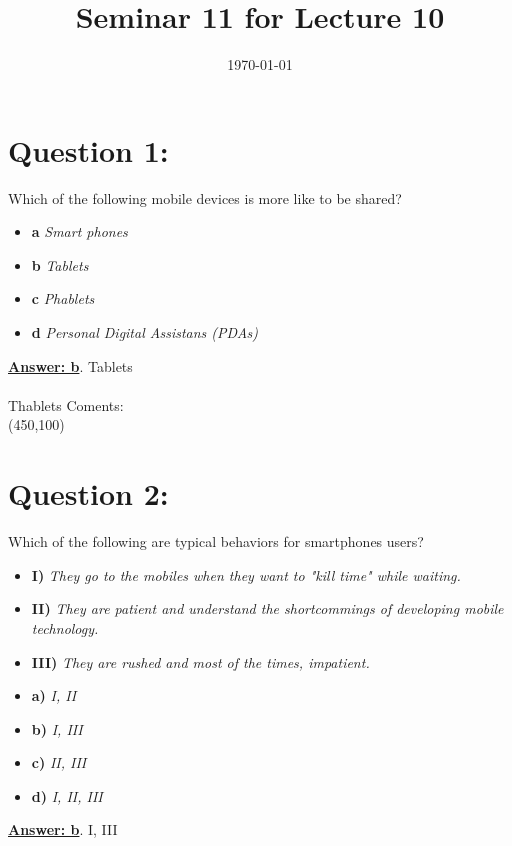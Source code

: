 \documentclass[12pt,a4paper,norsk]{article}
\title{Seminar 11 for Lecture 10}
\author{}
\date{\today}
\begin{document}
\maketitle
\noindent \section {Question 1:}Which of the following mobile devices is more like to be shared?\\

\begin{itemize}
 \item \textbf{a} \textit{ Smart phones}
 \item \textbf{b} \textit{ Tablets}
 \item \textbf{c} \textit{ Phablets}
 \item \textbf{d} \textit{ Personal Digital Assistans (PDAs)}
\end{itemize}

\underline {\textbf{Answer: b}}. Tablets\\
\indent \\ Thablets
\noindent Coments:\\
\framebox(450,100){}\\

\noindent \section{ Question 2:} Which of the following are typical behaviors for smartphones users?\\

\begin{itemize}
 \item \textbf{I)} \textit{They go to the mobiles when they want to "kill time" while waiting.}
 \item \textbf{II)} \textit{They are patient and understand the shortcommings of developing mobile technology.}
 \item \textbf{III)} \textit{They are rushed and most of the times, impatient.}
\end{itemize}

\begin{itemize}
 \item \textbf{a)} \textit{I, II}
 \item \textbf{b)} \textit{I, III}
 \item \textbf{c)} \textit{II, III}
 \item \textbf{d)} \textit{I, II, III}
\end{itemize}
\underline{\textbf{Answer: b}}. I, III\\
\end{document}
